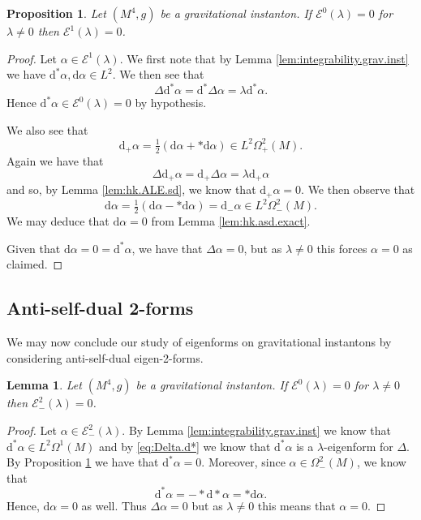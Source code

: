 \documentclass{article}
\newtheorem{lem}[thm]{Lemma}
\newtheorem{prop}[thm]{Proposition}
\theoremstyle{definition}
\numberwithin{thm}{section}
\numberwithin{equation}{section}
\def\d{\mathrm{d}}
\begin{document}
 
\begin{prop}\label{prop:hk.ALE.1forms} Let $(M^4,g)$ be a gravitational instanton.  If $\mathcal{E}^0(\lambda)=0$ for $\lambda\neq 0$ then $\mathcal{E}^1(\lambda)=0$.
\end{prop}

\begin{proof}  Let $\alpha\in \mathcal{E}^1(\lambda)$.  
 We first note that by Lemma \ref{lem:integrability.grav.inst} we have $\d^*\alpha,\d\alpha\in L^2$.  We then see that
 \begin{equation}\label{eq:Delta.d*}
      \Delta \d^*\alpha=\d^*\Delta\alpha=\lambda\d^*\alpha.
 \end{equation}
 Hence $\d^*\alpha\in \mathcal{E}^0(\lambda)=0$ by hypothesis.
 
 
 We also see that 
\begin{equation}
     \d_+\alpha=\tfrac{1}{2}(\d\alpha+*\d\alpha)\in L^2\Omega^2_+(M).
\end{equation}
 Again we have that
\begin{equation}
    \Delta \d_+\alpha=\d_+\Delta\alpha=\lambda\d_+\alpha
\end{equation}
and so, by Lemma \ref{lem:hk.ALE.sd}, we know that $\d_+\alpha=0$. We then observe that
\begin{equation}
    \d\alpha=\tfrac{1}{2}(\d\alpha-*\d\alpha)=\d_-\alpha\in L^2\Omega^2_-(M).
\end{equation}
We may deduce that $\d\alpha=0$ from Lemma \ref{lem:hk.asd.exact}.

Given that $\d\alpha=0=\d^*\alpha$, we have that $\Delta\alpha=0$, but as $\lambda\neq 0$ this forces $\alpha=0$ as claimed.
\end{proof}

\subsection{Anti-self-dual 2-forms}

We may now conclude our study of eigenforms on gravitational instantons by considering anti-self-dual eigen-2-forms.

\begin{lem}\label{lem:hk.ALE.asd} Let $(M^4,g)$ be a gravitational instanton.  If $\mathcal{E}^0(\lambda)=0$ for $\lambda\neq 0$ then $\mathcal{E}^2_-(\lambda)=0$. 
\end{lem}

\begin{proof}  Let $\alpha\in\mathcal{E}^2_-(\lambda)$.  
By Lemma \ref{lem:integrability.grav.inst} we know that $\d^*\alpha\in L^2\Omega^1(M)$ and by \eqref{eq:Delta.d*} we know that $\d^*\alpha$ is a $\lambda$-eigenform for $\Delta$.  By Proposition \ref{prop:hk.ALE.1forms} we have that $\d^*\alpha=0$.  Moreover, since $\alpha\in\Omega^2_-(M)$, we know that
\begin{equation}
    \d^*\alpha=-*\d*\alpha=*\d\alpha.
\end{equation}
Hence, $\d\alpha=0$ as well.  Thus $\Delta\alpha=0$ but as $\lambda\neq 0$ this means that $\alpha=0$.
\end{proof}
\end{document}
